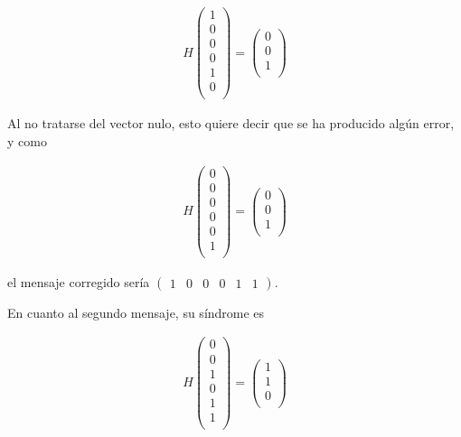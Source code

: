\documentclass{article}
\begin{document}
\begin{align*}
  H
  \begin{pmatrix} 
    1 \\
    0 \\
    0 \\
    0 \\
    1 \\
    0 \\
  \end{pmatrix}
  = \begin{pmatrix} 
    0 \\ 
    0 \\
    1 \\
  \end{pmatrix}
\end{align*}

Al no tratarse del vector nulo, esto quiere decir que se ha
producido algún error, y como 

\begin{align*}
  H
  \begin{pmatrix} 
    0 \\
    0 \\
    0 \\
    0 \\
    0 \\
    1 \\
  \end{pmatrix}
  = \begin{pmatrix} 
    0 \\ 
    0 \\
    1 \\
  \end{pmatrix}
\end{align*}

el mensaje corregido sería $\begin{pmatrix}
1 & 0 & 0 & 0 & 1 & 1 \end{pmatrix}$.

En cuanto al segundo mensaje, su síndrome es

\begin{align*}
  H
  \begin{pmatrix} 
    0 \\
    0 \\
    1 \\
    0 \\
    1 \\
    1 \\
  \end{pmatrix}
  = \begin{pmatrix} 
    1 \\ 
    1 \\
    0 \\
  \end{pmatrix}
\end{align*}
\end{document}
